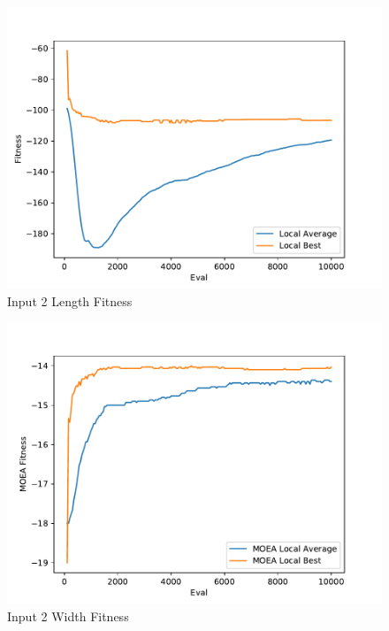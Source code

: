 \documentclass{standalone}
\begin{document}
\begin{figure}[!htb]
	\caption{Input 2 Length Fitness}
	\label{fig:graph_2004}
	\includegraphics[width=\textwidth]{../graphs/graphs/2004.pdf}
\end{figure}


\begin{figure}[!htb]
	\caption{Input 2 Width Fitness}
	\label{fig:graph_2004_moea}
	\includegraphics[width=\textwidth]{../graphs/graphs/2004_moea.pdf}
\end{figure}
\end{document}
